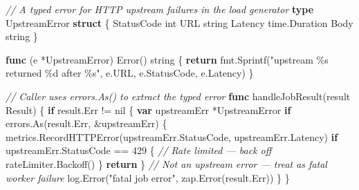 \documentclass[
]{article}
\newenvironment{Shaded}{}{}
\newcommand{\CommentTok}[1]{\textcolor[rgb]{0.38,0.63,0.69}{\textit{#1}}}
\newcommand{\ControlFlowTok}[1]{\textcolor[rgb]{0.00,0.44,0.13}{\textbf{#1}}}
\newcommand{\DataTypeTok}[1]{\textcolor[rgb]{0.56,0.13,0.00}{#1}}
\newcommand{\DecValTok}[1]{\textcolor[rgb]{0.25,0.63,0.44}{#1}}
\newcommand{\KeywordTok}[1]{\textcolor[rgb]{0.00,0.44,0.13}{\textbf{#1}}}
\newcommand{\NormalTok}[1]{#1}
\newcommand{\OperatorTok}[1]{\textcolor[rgb]{0.40,0.40,0.40}{#1}}
\newcommand{\OtherTok}[1]{\textcolor[rgb]{0.00,0.44,0.13}{#1}}
\newcommand{\StringTok}[1]{\textcolor[rgb]{0.25,0.44,0.63}{#1}}
\begin{document}
\begin{Shaded}
\begin{Highlighting}[]
\CommentTok{// A typed error for HTTP upstream failures in the load generator}
\KeywordTok{type}\NormalTok{ UpstreamError }\KeywordTok{struct} \OperatorTok{\{}
\NormalTok{    StatusCode }\DataTypeTok{int}
\NormalTok{    URL        }\DataTypeTok{string}
\NormalTok{    Latency    time}\OperatorTok{.}\NormalTok{Duration}
\NormalTok{    Body       }\DataTypeTok{string}
\OperatorTok{\}}

\KeywordTok{func} \OperatorTok{(}\NormalTok{e }\OperatorTok{*}\NormalTok{UpstreamError}\OperatorTok{)}\NormalTok{ Error}\OperatorTok{()} \DataTypeTok{string} \OperatorTok{\{}
    \ControlFlowTok{return}\NormalTok{ fmt}\OperatorTok{.}\NormalTok{Sprintf}\OperatorTok{(}\StringTok{"upstream \%s returned \%d after \%s"}\OperatorTok{,}\NormalTok{ e}\OperatorTok{.}\NormalTok{URL}\OperatorTok{,}\NormalTok{ e}\OperatorTok{.}\NormalTok{StatusCode}\OperatorTok{,}\NormalTok{ e}\OperatorTok{.}\NormalTok{Latency}\OperatorTok{)}
\OperatorTok{\}}

\CommentTok{// Caller uses errors.As() to extract the typed error}
\KeywordTok{func}\NormalTok{ handleJobResult}\OperatorTok{(}\NormalTok{result Result}\OperatorTok{)} \OperatorTok{\{}
    \ControlFlowTok{if}\NormalTok{ result}\OperatorTok{.}\NormalTok{Err }\OperatorTok{!=} \OtherTok{nil} \OperatorTok{\{}
        \KeywordTok{var}\NormalTok{ upstreamErr }\OperatorTok{*}\NormalTok{UpstreamError}
        \ControlFlowTok{if}\NormalTok{ errors}\OperatorTok{.}\NormalTok{As}\OperatorTok{(}\NormalTok{result}\OperatorTok{.}\NormalTok{Err}\OperatorTok{,} \OperatorTok{\&}\NormalTok{upstreamErr}\OperatorTok{)} \OperatorTok{\{}
\NormalTok{            metrics}\OperatorTok{.}\NormalTok{RecordHTTPError}\OperatorTok{(}\NormalTok{upstreamErr}\OperatorTok{.}\NormalTok{StatusCode}\OperatorTok{,}\NormalTok{ upstreamErr}\OperatorTok{.}\NormalTok{Latency}\OperatorTok{)}
            \ControlFlowTok{if}\NormalTok{ upstreamErr}\OperatorTok{.}\NormalTok{StatusCode }\OperatorTok{==} \DecValTok{429} \OperatorTok{\{}
                \CommentTok{// Rate limited — back off}
\NormalTok{                rateLimiter}\OperatorTok{.}\NormalTok{Backoff}\OperatorTok{()}
            \OperatorTok{\}}
            \ControlFlowTok{return}
        \OperatorTok{\}}
        \CommentTok{// Not an upstream error — treat as fatal worker failure}
\NormalTok{        log}\OperatorTok{.}\NormalTok{Error}\OperatorTok{(}\StringTok{"fatal job error"}\OperatorTok{,}\NormalTok{ zap}\OperatorTok{.}\NormalTok{Error}\OperatorTok{(}\NormalTok{result}\OperatorTok{.}\NormalTok{Err}\OperatorTok{))}
    \OperatorTok{\}}
\OperatorTok{\}}
\end{Highlighting}
\end{Shaded}
\end{document}
